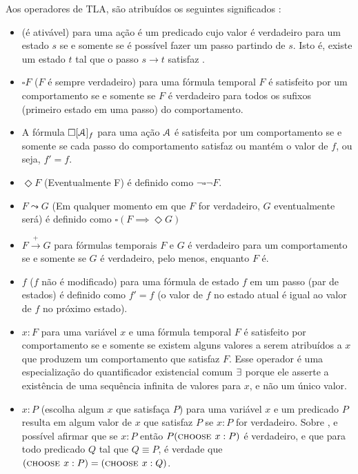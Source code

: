 Aos operadores de TLA, são atribuídos os seguintes significados \cite{tlaformalization}:
\begin{itemize}
  \item \ENABLED \FANCYA (\FANCYA é ativável) para uma ação \FANCYA é um predicado cujo valor é verdadeiro para um estado $s$ se e somente se é possível fazer um passo \FANCYA partindo de $s$. Isto é, existe um estado $t$ tal que o passo $s \rightarrow t$ satisfaz \FANCYA.

  \item $\square F$ ($F$ é sempre verdadeiro) para uma fórmula temporal $F$ é satisfeito por um comportamento se e somente se $F$ é verdadeiro para todos os sufixos (primeiro estado em uma passo) do comportamento.

  \item A fórmula $\square [\textbf{$\mathcal{A}$}]_f$ para uma ação $\textbf{$\mathcal{A}$}$ é satisfeita por um comportamento se e somente se cada passo do comportamento satisfaz \FANCYA ou mantém o valor de $f$, ou seja, $f' = f$.

  \item $\Diamond F$ (Eventualmente F) é definido como $\neg \square \neg F$.

  \item $F \leadsto G$ (Em qualquer momento em que $F$ for verdadeiro, $G$ eventualmente será) é definido como $\square(F \implies \Diamond G)$

  \item $F \stackrel{+}\rightarrow G$ para fórmulas temporais $F$ e $G$ é verdadeiro para um comportamento se e somente se $G$ é verdadeiro, pelo menos, enquanto $F$ é.

  \item \UNCHANGED $f$ ($f$ não é modificado) para uma fórmula de estado $f$ em um passo (par de estados) é definido como $f' = f$  (o valor de $f$ no estado atual é igual ao valor de $f$ no próximo estado).

  \item \EE $x : F$ para uma variável $x$ e uma fórmula temporal $F$ é satisfeito por comportamento se e somente se existem alguns valores a serem atribuídos a $x$ que produzem um comportamento que satisfaz $F$. Esse operador é uma especialização do quantificador existencial comum $\exists$ porque ele asserte a existência de uma sequência infinita de valores para $x$, e não um único valor.

  \item \CHOOSE $x : P$ (escolha algum $x$ que satisfaça $P$) para uma variável $x$ e um predicado $P$ resulta em algum valor de $x$ que satisfaz $P$ se \EE $x : P$ for verdadeiro. Sobre \CHOOSE, e possível afirmar que se \EE $x : P$ então $P(\textsc{choose } x : P)$ é verdadeiro, e que para todo predicado $Q$ tal que $Q \equiv P$, é verdade que $(\textsc{choose } x : P) = (\textsc{choose } x : Q)$.


\end{itemize}
